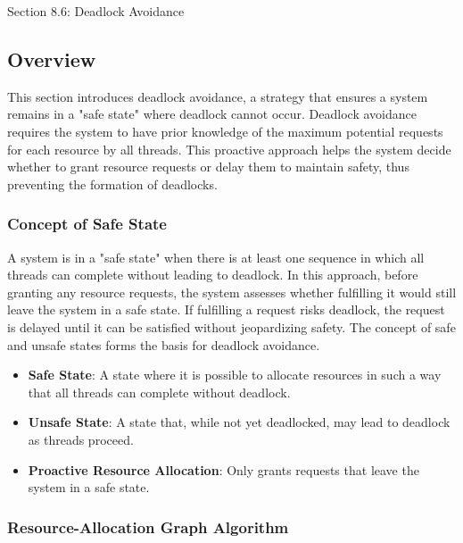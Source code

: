 \begin{notes}{Section 8.6: Deadlock Avoidance}
    \subsection*{Overview}

    This section introduces deadlock avoidance, a strategy that ensures a system remains in a "safe state" where deadlock cannot occur. Deadlock avoidance requires the system to have prior knowledge 
    of the maximum potential requests for each resource by all threads. This proactive approach helps the system decide whether to grant resource requests or delay them to maintain safety, thus 
    preventing the formation of deadlocks.
    
    \subsubsection*{Concept of Safe State}
    
    A system is in a "safe state" when there is at least one sequence in which all threads can complete without leading to deadlock. In this approach, before granting any resource requests, the system 
    assesses whether fulfilling it would still leave the system in a safe state. If fulfilling a request risks deadlock, the request is delayed until it can be satisfied without jeopardizing safety. 
    The concept of safe and unsafe states forms the basis for deadlock avoidance.
    
    \begin{highlight}
    
        \begin{itemize}
            \item \textbf{Safe State}: A state where it is possible to allocate resources in such a way that all threads can complete without deadlock.
            \item \textbf{Unsafe State}: A state that, while not yet deadlocked, may lead to deadlock as threads proceed.
            \item \textbf{Proactive Resource Allocation}: Only grants requests that leave the system in a safe state.
        \end{itemize}
    
    \end{highlight}
    
    \subsubsection*{Resource-Allocation Graph Algorithm}
    

\end{notes}
